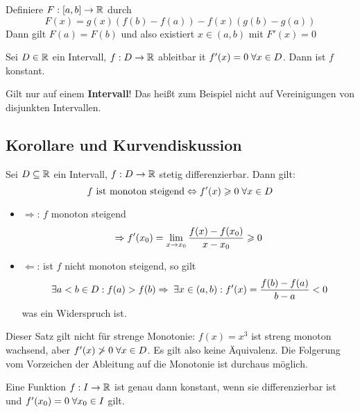 \documentclass[main.tex]{subfiles}
\begin{document}
\begin{Beweis}
  Definiere $F : [a,b] \to \mathbb{R}$ durch
  $$F(x) = g(x)(f(b) - f(a)) - f(x)(g(b) - g(a))$$
  Dann gilt $F(a) = F(b)$ und also existiert $x \in (a,b)$ mit $F'(x) = 0$
\end{Beweis}

\begin{Korollar}
  Sei $D \in \mathbb{R}$ ein Intervall, $f: D \to \mathbb{R}$ ableitbar it $f'(x) = 0 \;\forall x \in D$. Dann ist $f$ konstant.
\end{Korollar}

\begin{Bemerkung}
  Gilt nur auf einem \textbf{Intervall}! Das heißt zum Beispiel nicht auf Vereinigungen von disjunkten Intervallen.
\end{Bemerkung}

\subsection{Korollare und Kurvendiskussion}

\begin{Theorem}[Monotonie]
  Sei $D \subseteq \mathbb{R}$ ein Intervall, $f : D \to \mathbb{R}$ stetig differenzierbar. Dann gilt:
  $$f \text{ ist monoton steigend} \Leftrightarrow f'(x) \geqslant 0 \;\forall x \in D$$
\end{Theorem}

\begin{Beweis}
  \begin{itemize}
    \item $\Rightarrow$: $f$ monoton steigend
      $$\Rightarrow f'(x_0) = \lim \limits_{x \to x_0} \dfrac{f(x)-f(x_0)}{x - x_0} \geqslant 0$$
    \item $\Leftarrow$: ist $f$ nicht monoton steigend, so gilt
     $$\;\exists a < b \in D : f(a) > f(b) \Rightarrow \;\exists x \in (a,b): f'(x) = \dfrac{f(b)-f(a)}{b-a} < 0 $$
     was ein Widerspruch ist.
  \end{itemize}
\end{Beweis}

\begin{Bemerkung}
  Dieser Satz gilt nicht für strenge Monotonie: $f(x)=x^3$ ist streng monoton wachsend, aber $f'(x) \not> 0 \;\forall x \in D$. Es gilt also keine Äquivalenz. Die Folgerung vom Vorzeichen der Ableitung auf die Monotonie ist durchaus möglich.
\end{Bemerkung}

\begin{Korollar}
  Eine Funktion $f: I \to \mathbb{R}$ ist genau dann konstant, wenn sie differenzierbar ist und $f'(x_0) = 0 \;\forall x_0 \in I$ gilt.
\end{Korollar}
\end{document}
